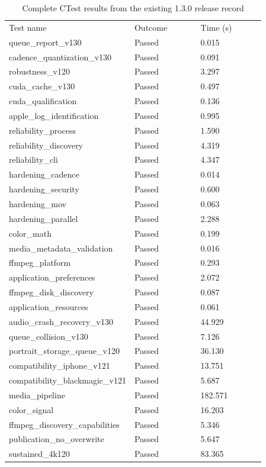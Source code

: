 \documentclass[11pt,a4paper,openany]{book}
\begin{document}
\begin{longtable}{p{0.287\linewidth}p{0.287\linewidth}p{0.287\linewidth}}
\caption{Complete CTest results from the existing 1.3.0 release record}\\
\toprule
Test name & Outcome & Time (s)\\
queue\_report\_v130 & Passed & 0.015\\
cadence\_quantization\_v130 & Passed & 0.091\\
robustness\_v120 & Passed & 3.297\\
cuda\_cache\_v130 & Passed & 0.497\\
cuda\_qualification & Passed & 0.136\\
apple\_log\_identification & Passed & 0.995\\
reliability\_process & Passed & 1.590\\
reliability\_discovery & Passed & 4.319\\
reliability\_cli & Passed & 4.347\\
hardening\_cadence & Passed & 0.014\\
hardening\_security & Passed & 0.600\\
hardening\_mov & Passed & 0.063\\
hardening\_parallel & Passed & 2.288\\
color\_math & Passed & 0.199\\
media\_metadata\_validation & Passed & 0.016\\
ffmpeg\_platform & Passed & 0.293\\
application\_preferences & Passed & 2.072\\
ffmpeg\_disk\_discovery & Passed & 0.087\\
application\_resources & Passed & 0.061\\
audio\_crash\_recovery\_v130 & Passed & 44.929\\
queue\_collision\_v130 & Passed & 7.126\\
portrait\_storage\_queue\_v120 & Passed & 36.130\\
compatibility\_iphone\_v121 & Passed & 13.751\\
compatibility\_blackmagic\_v121 & Passed & 5.687\\
media\_pipeline & Passed & 182.571\\
color\_signal & Passed & 16.203\\
ffmpeg\_discovery\_capabilities & Passed & 5.346\\
publication\_no\_overwrite & Passed & 5.647\\
sustained\_4k120 & Passed & 83.365\\
\bottomrule
\end{longtable}
\end{document}
